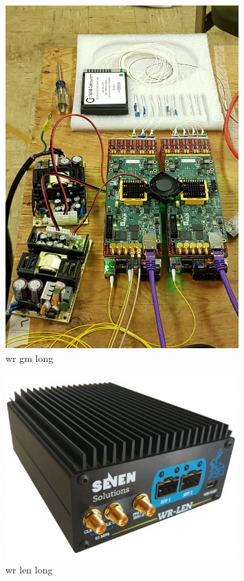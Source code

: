\begin{figure}
    \includegraphics[width=0.8\textwidth]{diagrams/5-daq/wr_gm.jpg}
    \caption[wr gm short]{wr gm long}
    \label{fig:wr_gm}
\end{figure}

\begin{figure}
    \includegraphics[width=0.8\textwidth]{diagrams/5-daq/wr_len.jpg}
    \caption[wr len short]{wr len long}
    \label{fig:wr_len}
\end{figure}

